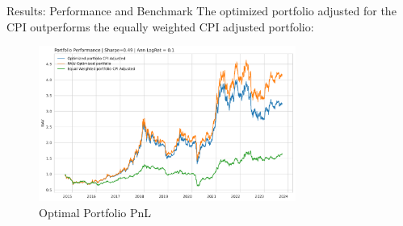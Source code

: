 \documentclass{beamer}
\begin{document}
\begin{frame}{Results: Performance and Benchmark}
The optimized portfolio adjusted for the CPI outperforms the equally weighted CPI adjusted portfolio:
  \begin{figure}
    \centering
    \includegraphics[width=0.75\textwidth]{paper/figure/PNL.pdf}
    \caption{Optimal Portfolio PnL}
  \end{figure}
\end{frame}
\end{document}
